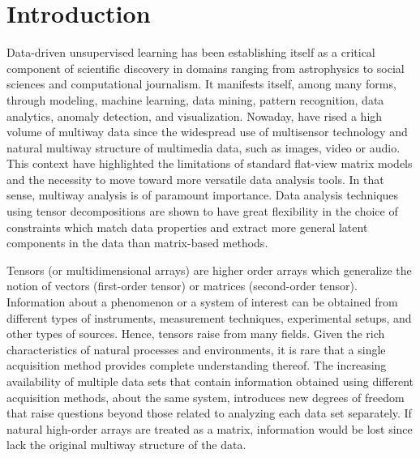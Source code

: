\documentclass[letterpaper,12pt]{article}
\begin{document}
  



\clearpage


\clearpage

\tableofcontents

\newpage

\section{Introduction}

Data-driven unsupervised learning has been establishing itself as a critical component of scientific discovery in domains ranging from astrophysics to social sciences and computational journalism. It manifests itself, among many forms, through modeling, machine learning, data mining, pattern recognition, data analytics, anomaly detection, and visualization. Nowaday, have rised a high volume of multiway data since the widespread use of multisensor technology and natural multiway structure of multimedia data, such as images, video or audio. This context have highlighted the limitations of standard flat-view matrix models and the necessity to move toward more versatile data analysis tools. In that sense, multiway analysis is of paramount importance. Data analysis techniques using tensor decompositions are shown to have great flexibility in the choice of constraints which match data properties and extract more general latent components in the data than matrix-based methods.

Tensors (or multidimensional arrays) are higher order arrays which generalize the notion of vectors (first-order tensor) or matrices (second-order tensor). Information about a phenomenon or a system of interest can be obtained from different types of instruments, measurement techniques, experimental setups, and other types of sources. Hence, tensors raise from many fields. Given the rich characteristics of natural processes and environments, it is rare that a single acquisition method provides complete understanding thereof. The increasing availability of multiple data sets that contain information obtained using different acquisition methods, about the same system, introduces new degrees of freedom that raise questions beyond those related to analyzing each data set separately. If natural high-order arrays are treated as a matrix, information would be lost since lack the original multiway structure of the data.
\end{document}
